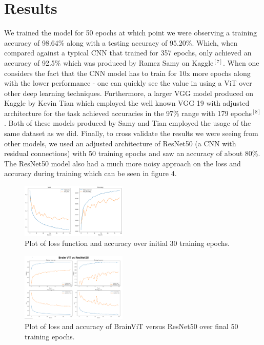 \documentclass[conference]{IEEEtran}
\begin{document}
\section{Results}
We trained the model for 50 epochs at which point we were observing a training accuracy of 98.64\% along with a testing accuracy of 95.20\%. Which, when compared against a typical CNN that trained for 357 epochs, only achieved an accuracy of 92.5\% which was produced by Ramez Samy on Kaggle$^{[7]}$. When one considers the fact that the CNN model has to train for 10x more epochs along with the lower performance - one can quickly see the value in using a ViT over other deep learning techniques. Furthermore, a larger VGG model produced on Kaggle by Kevin Tian which employed the well known VGG 19 with adjusted architecture for the task achieved accuracies in the 97\% range with 179 epochs$^{[8]}$. Both of these models produced by Samy and Tian employed the usage of the same dataset as we did. Finally, to cross validate the results we were seeing from other models, we used an adjusted architecture of ResNet50 (a CNN with residual connections) with 50 training epochs and saw an accuracy of about 80\%. The ResNet50 model also had a much more noisy approach on the loss and accuracy during training which can be seen in figure 4.

\begin{figure}[htbp]
    \centering
    \includegraphics[width=0.45\textwidth]{graph.png}
    \caption{Plot of loss function and accuracy over initial 30 training epochs.}
    \label{fig:2}
\end{figure}

\begin{figure}[htbp]
    \centering
    \includegraphics[width=0.45\textwidth]{resnet versus brainvit.PNG}
    \caption{Plot of loss and accuracy of BrainViT versus ResNet50 over final 50 training epochs.}
    \label{fig:3}
\end{figure}
\end{document}
